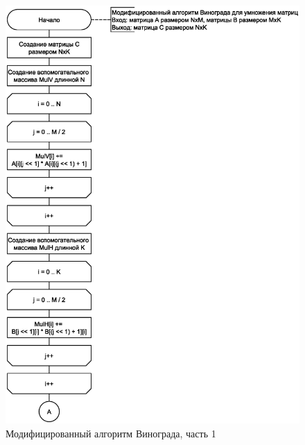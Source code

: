 \clearpage

\begin{figure}[h]
	\centering
	\includegraphics[scale=0.75]{img/vinograd_mod_1.eps}
	\caption{Модифицированный алгоритм Винограда, часть 1}
	\label{fig:mvin1}
\end{figure}

\clearpage


